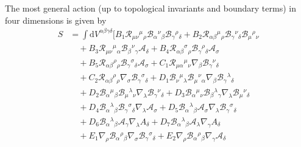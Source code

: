 The most general action (up to topological invariants and boundary terms) in four dimensions is given by
\begin{equation}
\label{PAG_action}
\begin{split}
S & = \int  \mathrm{d}V^{\alpha \beta \gamma \delta} \bigg[
      B_1 \mathcal{R}_{\mu\nu}{}^{\mu}{}_{\rho}\mathcal{B}_{\alpha}{}^{\nu}{}_{\beta}\mathcal{B}_{\gamma}{}^{\rho}{}_{\delta}
    + B_2 \mathcal{R}_{\alpha\beta}{}^{\mu}{}_{\rho} \mathcal{B}_{\gamma}{}^{\nu}{}_{\delta} \mathcal{B}_{\mu}{}^{\rho}{}_{\nu}
    \\
    & \quad
    + B_3 \mathcal{R}_{\mu\nu}{}^{\mu}{}_{\alpha} \mathcal{B}_{\beta}{}^{\nu}{}_{\gamma} \mathcal{A}_\delta
    + B_4 \mathcal{R}_{\alpha\beta}{}^{\sigma}{}_{\rho}\mathcal{B}_{\gamma}{}^{\rho}{}_{\delta}\mathcal{A}_\sigma
    \\
    & \quad
    + B_5 \mathcal{R}_{\alpha \beta}{}^{\rho}{}_{\rho} \mathcal{B}_{\gamma}{}^{\sigma}{}_{\delta} \mathcal{A}_\sigma
    + C_1 \mathcal{R}_{\mu\alpha}{}^{\mu}{}_{\nu} \nabla_\beta \mathcal{B}_{\gamma}{}^{\nu}{}_{\delta}
    \\
    & \quad
    + C_2 \mathcal{R}_{\alpha\beta}{}^{\rho}{}_{\rho} \nabla_\sigma \mathcal{B}_{\gamma}{}^{\sigma}{}_{\delta}
    + D_1 \mathcal{B}_{\nu}{}^{\mu}{}_{\lambda} \mathcal{B}_{\mu}{}^{\nu}{}_{\alpha} \nabla_\beta \mathcal{B}_{\gamma}{}^{\lambda}{}_{\delta}
    \\
    & \quad
    + D_2 \mathcal{B}_{\alpha}{}^{\mu}{}_{\beta} \mathcal{B}_{\mu}{}^{\lambda}{}_{\nu} \nabla_{\lambda} \mathcal{B}_{\gamma}{}^{\nu}{}_{\delta}
    + D_3 \mathcal{B}_{\alpha}{}^{\mu}{}_{\nu}\mathcal{B}_{\beta}{}^{\lambda}{}_{\gamma} \nabla_\lambda \mathcal{B}_{\mu}{}^{\nu}{}_{\delta}
    \\
    & \quad
    + D_4 \mathcal{B}_{\alpha}{}^{\lambda}{}_{\beta}\mathcal{B}_{\gamma}{}^{\sigma}{}_{\delta}\nabla_\lambda \mathcal{A}_\sigma
    + D_5 \mathcal{B}_{\alpha}{}^{\lambda}{}_{\beta} \mathcal{A}_\sigma \nabla_\lambda \mathcal{B}_{\gamma}{}^{\sigma}{}_{\delta}
    \\
    &\quad
    + D_6 \mathcal{B}_{\alpha}{}^{\lambda}{}_{\beta}\mathcal{A}_\gamma \nabla_\lambda A_\delta
    + D_7\mathcal{B}_{\alpha}{}^{\lambda}{}_{\beta} \mathcal{A}_\lambda \nabla_\gamma A_\delta
    \\
    & \quad
    + E_1\nabla_\rho \mathcal{B}_{\alpha}{}^{\rho}{}_{\beta} \nabla_\sigma \mathcal{B}_{\gamma}{}^{\sigma}{}_{\delta}
    + E_2 \nabla_\rho \mathcal{B}_{\alpha}{}^{\rho}{}_{\beta} \nabla_\gamma \mathcal{A}_\delta

\end{split}
\end{equation}
